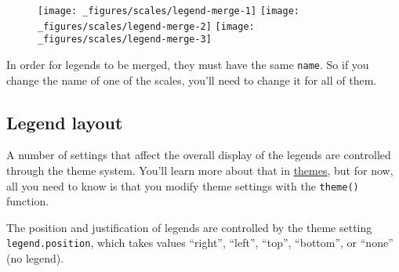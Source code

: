 \begin{figure}[H]
  \texttt{[image: \_figures/scales/legend-merge-1]}%
  \texttt{[image: \_figures/scales/legend-merge-2]}%
  \texttt{[image: \_figures/scales/legend-merge-3]}
\end{figure}

In order for legends to be merged, they must have the same
\texttt{name}. So if you change the name of one of the scales, you'll
need to change it for all of them.

\hypertarget{sub:legend-layout}{%
\subsection{Legend layout}\label{sub:legend-layout}}

A number of settings that affect the overall display of the legends are
controlled through the theme system. You'll learn more about that in
\protect\hyperlink{sec:themes}{themes}, but for now, all you need to
know is that you modify theme settings with the \texttt{theme()}
function. 

The position and justification of legends are controlled by the theme
setting \texttt{legend.position}, which takes values ``right'',
``left'', ``top'', ``bottom'', or ``none'' (no legend).

\begin{Shaded}
\begin{Highlighting}[]
\StringTok{ }\NormalTok{(} \OperatorTok{:}\NormalTok{, } \OperatorTok{:}\NormalTok{, } \NormalTok{(}\NormalTok{, }\NormalTok{, }\NormalTok{))}
\StringTok{ }\OperatorTok{+}\StringTok{ }
\StringTok{  }\NormalTok{(}\NormalTok{(} \NormalTok{) }\OperatorTok{+}\StringTok{ }
\StringTok{  }\NormalTok{(}\NormalTok{) }\OperatorTok{+}\StringTok{ }
\StringTok{  }\NormalTok{(}\NormalTok{)}

\OperatorTok{+}\StringTok{ }\NormalTok{(} \NormalTok{) }
\OperatorTok{+}\StringTok{ }\NormalTok{(} \NormalTok{)}
\OperatorTok{+}\StringTok{ }\NormalTok{(} \NormalTok{)}
\end{Highlighting}
\end{Shaded}

